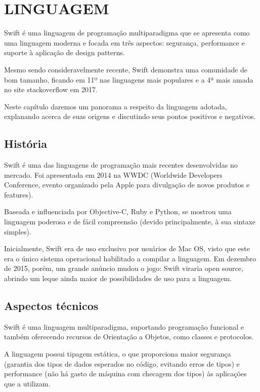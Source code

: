 \documentclass[rel_mlp]{iiufrgs}
\begin{document}
%

\chapter{LINGUAGEM} \label{intro}

Swift é uma linguagem de programação multiparadigma que se apresenta como uma linguagem moderna e focada em três aspectos: segurança, performance e suporte à aplicação de design patterns.

Mesmo sendo consideravelmente recente, Swift demonstra uma comunidade de bom tamanho, ficando em 11º nas linguagens mais populares e a 4ª mais amada no site stackoverflow em 2017. \cite{stack_overflow_developer_survey_results}

Neste capítulo daremos um panorama a respeito da linguagem adotada, explanando acerca de suas origens e discutindo seus pontos positivos e negativos.


\section{História}

Swift é uma das linguagens de programação mais recentes desenvolvidas no mercado. Foi apresentada em 2014 na WWDC (Worldwide Developers Conference, evento organizado pela Apple para divulgação de novos produtos e features).

Baseada e influenciada por Objective-C, Ruby e Python, se mostrou uma linguagem poderosa e de fácil compreensão (devido principalmente, à sua sintaxe simples).

Inicialmente, Swift era de uso exclusivo por usuários de Mac OS, visto que este era o único sistema operacional habilitado a compilar a linguagem. Em dezembro de 2015, porém, um grande anúncio mudou o jogo: Swift viraria open source, abrindo um leque ainda maior de possibilidades de uso para a linguagem.


\section{Aspectos técnicos}

Swift é uma linguagem multiparadigma, suportando programação funcional e também oferecendo recursos de Orientação a Objetos, como classes e protocolos.

A linguagem possui tipagem estática, o que proporciona maior segurança (garantia dos tipos de dados esperados no código, evitando erros de tipos) e performance (não há gasto de máquina com checagem dos tipos) às aplicações que a utilizam.
\end{document}
